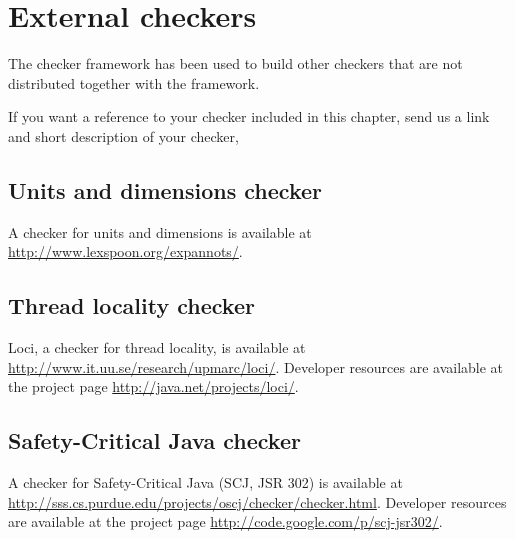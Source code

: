 \htmlhr
\chapter{External checkers\label{external-checkers}}

The checker framework has been used to build other checkers that are not
distributed together with the framework.

If you want a reference to your checker included in this chapter,
send us a link and short description of your checker, 


\section{Units and dimensions checker\label{units-checker}}

A checker for units and dimensions is available at
\url{http://www.lexspoon.org/expannots/}.


\section{Thread locality checker}

Loci, a checker for thread locality, is available at
\url{http://www.it.uu.se/research/upmarc/loci/}.
Developer resources are available at the project page
\url{http://java.net/projects/loci/}.







\section{Safety-Critical Java checker}

A checker for Safety-Critical Java (SCJ, JSR 302) is available at
\url{http://sss.cs.purdue.edu/projects/oscj/checker/checker.html}.
Developer resources are available at the project page
\url{http://code.google.com/p/scj-jsr302/}.





